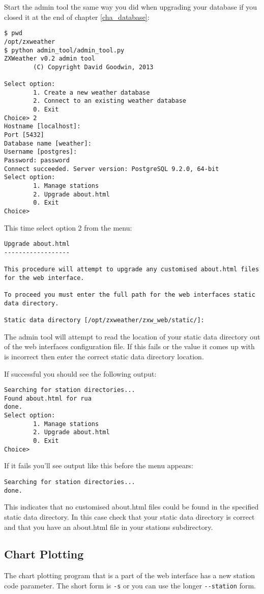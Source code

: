 \documentclass[a4paper,10pt,draft]{book}
\begin{document}
Start the admin tool the same way you did when upgrading your database if you closed it at the end of chapter \ref{cha_database}:
\begin{verbatim}
$ pwd
/opt/zxweather
$ python admin_tool/admin_tool.py
ZXWeather v0.2 admin tool
        (C) Copyright David Goodwin, 2013

Select option:
        1. Create a new weather database
        2. Connect to an existing weather database
        0. Exit
Choice> 2
Hostname [localhost]:
Port [5432]
Database name [weather]: 
Username [postgres]:
Password: password
Connect succeeded. Server version: PostgreSQL 9.2.0, 64-bit
Select option:
        1. Manage stations
        2. Upgrade about.html
        0. Exit
Choice>
\end{verbatim}

This time select option 2 from the menu:
\begin{verbatim}
Upgrade about.html
------------------

This procedure will attempt to upgrade any customised about.html files 
for the web interface.

To proceed you must enter the full path for the web interfaces static 
data directory.

Static data directory [/opt/zxweather/zxw_web/static/]:
\end{verbatim}

The admin tool will attempt to read the location of your static data directory out of the web interfaces configuration file. If this fails or the value it comes up with is incorrect then enter the correct static data directory location.

If successful you should see the following output:
\begin{verbatim}
Searching for station directories...
Found about.html for rua
done.
Select option:
        1. Manage stations
        2. Upgrade about.html
        0. Exit
Choice>
\end{verbatim}

If it fails you'll see output like this before the menu appears:
\begin{verbatim}
Searching for station directories...
done.
\end{verbatim}
This indicates that no customised about.html files could be found in the specified static data directory. In this case check that your static data directory is correct and that you have an about.html file in your stations subdirectory.

\subsection{Chart Plotting}
The chart plotting program that is a part of the web interface has a new station code parameter. The short form is \verb|-s| or you can use the longer \verb|--station| form.
\end{document}
